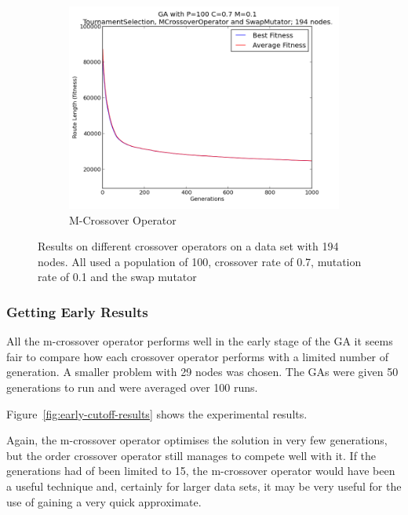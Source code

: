 \documentclass[10pt, a4paper]{article}
\begin{document}
\begin{figure}[h]
\begin{subfigure}[b]{0.67\textwidth}
\includegraphics[width=\textwidth]{img/results/mcrossoveroperator/swapmutator/n194p100c07m01}
\caption{M-Crossover Operator}
\end{subfigure}

\caption{Results on different crossover operators on a data set with 194 nodes.
         All used a population of 100, crossover rate of 0.7, mutation rate of 
         0.1 and the swap mutator}
\label{fig:time-graph-results}
\end{figure}


\subsubsection{Getting Early Results}

All the m-crossover operator performs well in the early stage of the GA it
seems fair to compare how each crossover operator performs with a limited 
number of generation. A smaller problem with 29 nodes was chosen. The GAs were
given 50 generations to run and were averaged over 100 runs.

Figure~\ref{fig:early-cutoff-results} shows the experimental results.

Again, the m-crossover operator optimises the solution in very few generations,
but the order crossover operator still manages to compete well with it. If the
generations had of been limited to 15, the m-crossover operator would have been
a useful technique and, certainly for larger data sets, it may be very useful
for the use of gaining a very quick approximate.
\end{document}
